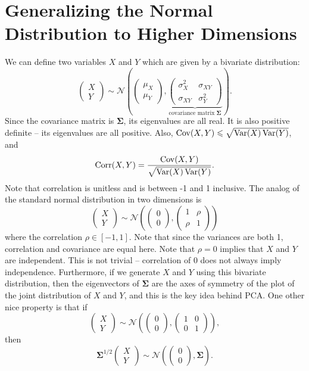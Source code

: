 \documentclass[12pt]{report}
\begin{document}
\section{Generalizing the Normal Distribution to Higher Dimensions}
We can define two variables $X$ and $Y$ which are given by a bivariate distribution: $$ \begin{pmatrix} X \\ Y \end{pmatrix} \sim \mathcal N\left(\begin{pmatrix} \mu_X \\ \mu_Y \end{pmatrix},\underbrace{\begin{pmatrix} \sigma_X^2 & \sigma_{XY} \\ \sigma_{XY} & \sigma_Y^2 \end{pmatrix}}_{\text{covariance matrix }\mathbf\Sigma}\right). $$ Since the covariance matrix is $\mathbf\Sigma$, its eigenvalues are all real. It is also positive definite -- its eigenvalues are all positive. Also, $\operatorname{Cov}(X,Y)\leqslant\sqrt{\operatorname{Var}(X)\operatorname{Var}(Y)}$, and $$ \operatorname{Corr}(X,Y)=\frac{\operatorname{Cov}(X,Y)}{\sqrt{\operatorname{Var}(X)\operatorname{Var}(Y)}}. $$ Note that correlation is unitless and is between -1 and 1 inclusive. The analog of the standard normal distribution in two dimensions is $$ \begin{pmatrix} X \\ Y \end{pmatrix}\sim\mathcal N\left(\begin{pmatrix} 0 \\ 0 \end{pmatrix},\begin{pmatrix} 1 & \rho \\ \rho & 1 \end{pmatrix}\right) $$ where the correlation $\rho\in[-1,1]$. Note that since the variances are both 1, correlation and covariance are equal here. Note that $\rho=0$ implies that $X$ and $Y$ are independent. This is not trivial -- correlation of 0 does not always imply independence. Furthermore, if we generate $X$ and $Y$ using this bivariate distribution, then the eigenvectors of $\mathbf\Sigma$ are the axes of symmetry of the plot of the joint distribution of $X$ and $Y$, and this is the key idea behind PCA. One other nice property is that if $$ \begin{pmatrix} X \\ Y \end{pmatrix}\sim\mathcal N\left(\begin{pmatrix} 0 \\ 0 \end{pmatrix}, \begin{pmatrix} 1 & 0 \\ 0 & 1 \end{pmatrix}\right), $$ then $$ \mathbf\Sigma^{1/2} \begin{pmatrix} X \\ Y \end{pmatrix}\sim\mathcal N\left(\begin{pmatrix} 0 \\ 0 \end{pmatrix}, \mathbf\Sigma\right). $$
\end{document}
